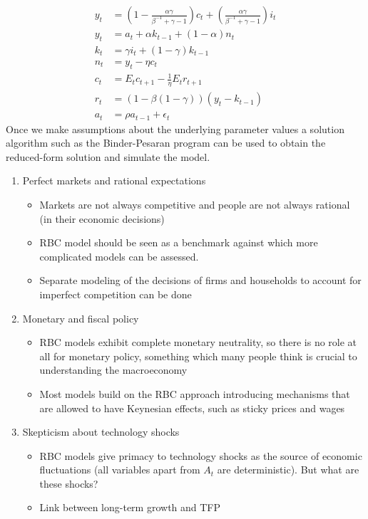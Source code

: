\documentclass{beamer}
\begin{document}
\begin{frame}
  \begin{align}
  y_t &= \left(1-\frac{\alpha \gamma}{\beta^{-1}+\gamma -1}\right)c_t +
  \left(\frac{\alpha \gamma}{\beta^{-1}+\gamma-1}\right)i_t\\
  y_t &= a_t +\alpha k_{t-1} + (1-\alpha)n_t\\
  k_t &= \gamma i_t + (1-\gamma)k_{t-1}\\
  n_t &= y_t-\eta c_t\\
  c_t &= E_t c_{t+1} - \frac{1}{\eta}E_t r_{t+1}\\
  r_t &= (1-\beta(1-\gamma))(y_t-k_{t-1})\\
  a_t &= \rho a_{t-1} + \epsilon_t
\end{align}
Once we make assumptions about the underlying parameter values a solution algorithm such as the Binder-Pesaran program can be used to obtain the reduced-form solution and simulate the model. 
\end{frame}

\begin{frame}
\begin{enumerate}
  \item Perfect markets and rational expectations
  \begin{itemize}
    \item Markets are not always competitive and people are not always rational (in their economic decisions)
    \item RBC model should be seen as a benchmark against which more complicated models can be assessed. 
    \item Separate modeling of the decisions of firms and households to account for imperfect competition can be done    
  \end{itemize}

  \item Monetary and fiscal policy
  \begin{itemize}
    \item RBC models exhibit complete monetary neutrality, so there is no role at all for monetary policy, something which many people think is crucial to understanding the macroeconomy
    \item Most models build on the RBC approach introducing mechanisms that are allowed to have Keynesian effects, such as sticky prices and
    wages 
  \end{itemize}
  \item Skepticism about technology shocks
  \begin{itemize}
    \item RBC models give primacy to technology shocks as the source of economic fluctuations (all variables apart from $A_t$ are
    deterministic). But what are these shocks?
    \item Link between long-term growth and TFP
  \end{itemize}
\end{enumerate}

\end{frame}
\end{document}
